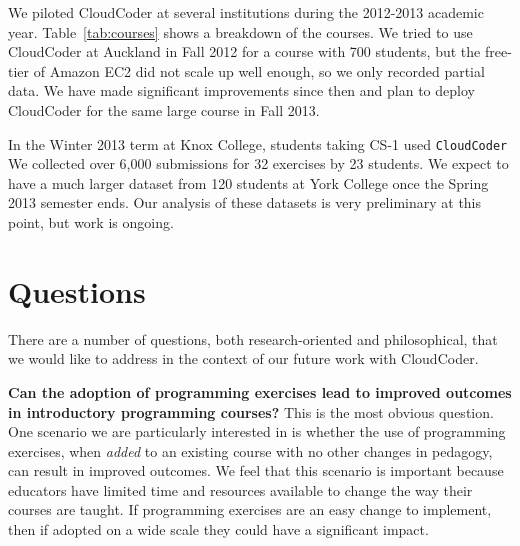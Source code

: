\documentclass{sig-alternate}
\begin{document}
We piloted CloudCoder at several institutions during the 2012-2013
academic year.  Table~\ref{tab:courses} shows a breakdown of the
courses.  We tried to use CloudCoder at Auckland in Fall 2012 for a
course with 700 students, but the free-tier of Amazon EC2 did not
scale up well enough, so we only recorded partial data.  We have made
significant improvements since then and plan to deploy CloudCoder for
the same large course in Fall 2013.


In the Winter 2013 term at Knox College, students taking CS-1 used {\tt CloudCoder}
%
% 
We collected over 6,000 submissions
for 32 exercises by 23 students.  We expect to have a much larger
dataset from 120 students at 
York College 
once the Spring 2013 semester ends.  Our analysis of these datasets is
very preliminary at this point, but work is ongoing.


\section{Questions}\label{sec:questions}

%

There are a number of questions, both research-oriented and philosophical,
that we would like to address in the context of our future work with CloudCoder.

{\bf Can the adoption of programming exercises lead to improved outcomes
in introductory programming courses?}  This is the most obvious
question.  One scenario we are particularly interested in is whether
the use of programming exercises, when {\em added} to an existing course with
no other changes in pedagogy, can result in improved outcomes.  We feel
that this scenario is important because educators have limited time
and resources available to change the way their courses are taught.
If programming exercises are an easy change to implement, then
if adopted on a wide scale they could have a significant impact.
\end{document}
